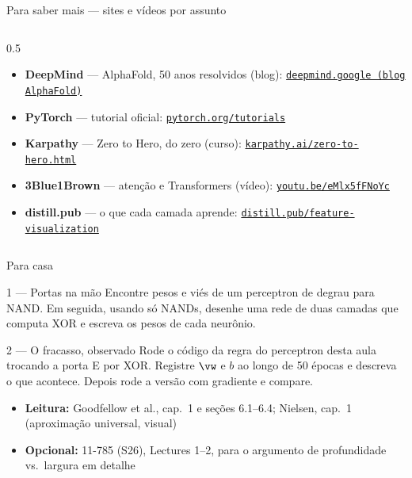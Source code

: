 \documentclass[aspectratio=169, 11pt]{beamer}
\begin{document}
\begin{frame}{Para saber mais — sites e vídeos por assunto}
\begin{columns}[T]
\begin{column}{0.5\textwidth}
{\begin{itemize}
              \href{https://www.nobelprize.org/prizes/physics/2024/press-release/}{\color{icAzulClaro}\texttt{nobelprize.org/prizes/physics/2024}}
        \item \textbf{DeepMind} — AlphaFold, 50 anos resolvidos (blog):
              \href{https://deepmind.google/discover/blog/alphafold-a-solution-to-a-50-year-old-grand-challenge-in-biology/}{\color{icAzulClaro}\texttt{deepmind.google (blog AlphaFold)}}
        \item \textbf{PyTorch} — tutorial oficial:
              \href{https://pytorch.org/tutorials/beginner/basics/intro.html}{\color{icAzulClaro}\texttt{pytorch.org/tutorials}}
        \item \textbf{Karpathy} — Zero to Hero, do zero (curso):
              \href{https://karpathy.ai/zero-to-hero.html}{\color{icAzulClaro}\texttt{karpathy.ai/zero-to-hero.html}}
        \item \textbf{3Blue1Brown} — atenção e Transformers (vídeo):
              \href{https://youtu.be/eMlx5fFNoYc}{\color{icAzulClaro}\texttt{youtu.be/eMlx5fFNoYc}}
        \item \textbf{distill.pub} — o que cada camada aprende:
              \href{https://distill.pub/2017/feature-visualization/}{\color{icAzulClaro}\texttt{distill.pub/feature-visualization}}
      \end{itemize}}
    \end{column}
  \end{columns}
\end{frame}

\begin{frame}{Para casa}
  \begin{exbox}{1 — Portas na mão}
    Encontre pesos e viés de um perceptron de degrau para NAND. Em seguida,
    usando só NANDs, desenhe uma rede de duas camadas que computa XOR e
    escreva os pesos de cada neurônio.
  \end{exbox}

  \begin{exbox}{2 — O fracasso, observado}
    Rode o código da regra do perceptron desta aula trocando a porta E por
    XOR. Registre $\vw$ e $b$ ao longo de 50 épocas e descreva o que acontece.
    Depois rode a versão com gradiente e compare.
  \end{exbox}

  \begin{itemize}\setlength{\itemsep}{0.25ex}
    \item \textbf{Leitura:} Goodfellow et al., cap.\ 1 e seções 6.1--6.4;
          Nielsen, cap.\ 1 (aproximação universal, visual)
    \item \textbf{Opcional:} 11-785 (S26), Lectures 1--2, para o argumento
          de profundidade vs.\ largura em detalhe
  \end{itemize}
\end{frame}
\end{document}
